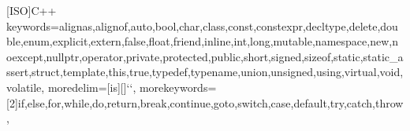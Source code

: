 \makeatletter
\newcommand\hlDigit[1]{\ifnum\lst@mode=\lst@Pmode\relax{\hlNum#1}\else#1\fi}
\makeatother
{}[ISO]{C++}{
	keywords={alignas,alignof,auto,bool,char,class,const,constexpr,decltype,delete,double,enum,explicit,extern,false,float,friend,inline,int,long,mutable,namespace,new,noexcept,nullptr,operator,private,protected,public,short,signed,sizeof,static,static_assert,struct,template,this,true,typedef,typename,union,unsigned,using,virtual,void,volatile},
	moredelim=[is][\hlNum]{`}{`},
	morekeywords=[2]{if,else,for,while,do,return,break,continue,goto,switch,case,default,try,catch,throw},
}
